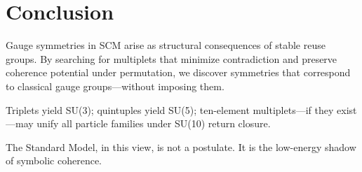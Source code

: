 \section{Conclusion}

Gauge symmetries in SCM arise as structural consequences of stable reuse groups. By searching for multiplets that minimize contradiction and preserve coherence potential under permutation, we discover symmetries that correspond to classical gauge groups—without imposing them.

Triplets yield SU(3); quintuples yield SU(5); ten-element multiplets—if they exist—may unify all particle families under SU(10) return closure.

The Standard Model, in this view, is not a postulate. It is the low-energy shadow of symbolic coherence.

